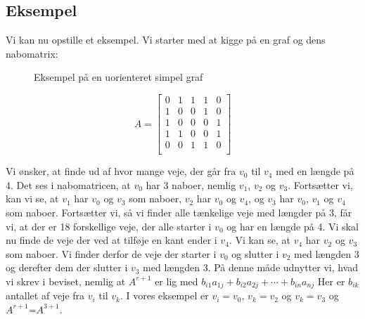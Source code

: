 \subsection{Eksempel}
Vi kan nu opstille et eksempel. Vi starter med at kigge på en graf og dens nabomatrix:
\begin{figure}[H]
\centering
	\caption{Eksempel på en uorienteret simpel graf}
	\label{fig.vaegtetopg}
\end{figure}


\begin{equation}
A=\begin{bmatrix}
    0&1&1&1&0\\
    1&0&0&1&0\\
    1&0&0&0&1\\
    1&1&0&0&1\\
    0&0&1&1&0\\
\end{bmatrix}
\end{equation}


Vi ønsker, at finde ud af hvor mange veje, der går fra $v_0$ til $v_4$ med en længde på 4. Det ses i nabomatricen, at $v_0$ har 3 naboer, nemlig $v_1$, $v_2$ og $v_3$. Fortsætter vi, kan vi se, at $v_1$ har $v_0$ og $v_3$ som naboer, $v_2$ har $v_0$ og $v_4$, og $v_3$ har $v_0$, $v_1$ og $v_4$ som naboer. Fortsætter vi, så vi finder alle tænkelige veje med længder på 3, får vi, at der er 18 forskellige veje, der alle starter i $v_0$ og har en længde på 4. Vi skal nu finde de veje der ved at tilføje en kant ender i $v_4$. Vi kan se, at $v_4$ har $v_2$ og $v_3$ som naboer. Vi finder derfor de veje der starter i $v_0$ og slutter i $v_2$ med længden 3 og derefter dem der slutter i $v_3$ med længden 3. På denne måde udnytter vi, hvad vi skrev i beviset, nemlig at
\textbf{$A^{r+1}$} er lig med $b_{i1}a_{1j} + b_{i2}a_{2j} +\cdots+ b_{in}a_{nj}$
Her er $b_{ik}$ antallet af veje fra $v_{i}$ til ${v_k}$. I vores eksempel er $v_{i}=v_{0}$, ${v_k}=v_{2}$ og ${v_k}=v_{3}$ og \textbf{$A^{r+1}$}=\textbf{$A^{3+1}$}. 
 
